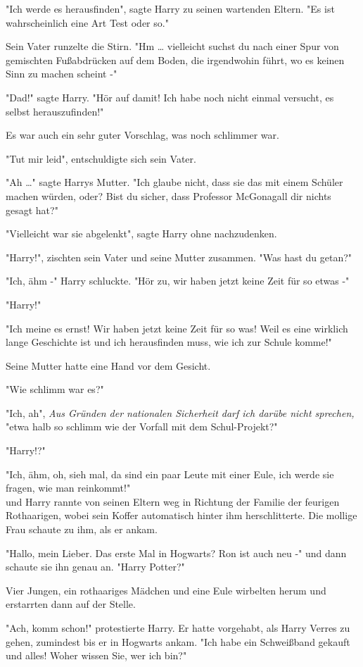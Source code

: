 {"Ich werde es herausfinden", sagte Harry zu seinen wartenden Eltern. "Es ist wahrscheinlich eine Art Test oder so."

Sein Vater runzelte die Stirn. "Hm … vielleicht suchst du nach einer Spur von gemischten Fußabdrücken auf dem Boden, die irgendwohin führt, wo es keinen Sinn zu machen scheint -"

"Dad!" sagte Harry. "Hör auf damit! Ich habe noch nicht einmal versucht, es selbst herauszufinden!"

Es war auch ein sehr guter Vorschlag, was noch schlimmer war.

"Tut mir leid", entschuldigte sich sein Vater.

"Ah …" sagte Harrys Mutter. "Ich glaube nicht, dass sie das mit einem Schüler machen würden, oder? Bist du sicher, dass Professor McGonagall dir nichts gesagt hat?"

"Vielleicht war sie abgelenkt", sagte Harry ohne nachzudenken.

"Harry!", zischten sein Vater und seine Mutter zusammen. "Was hast du getan?"

"Ich, ähm -" Harry schluckte. "Hör zu, wir haben jetzt keine Zeit für so etwas -"

"Harry!"

"Ich meine es ernst! Wir haben jetzt keine Zeit für so was! Weil es eine wirklich lange Geschichte ist und ich herausfinden muss, wie ich zur Schule komme!"

Seine Mutter hatte eine Hand vor dem Gesicht.

"Wie schlimm war es?"

"Ich, ah", \emph{Aus Gründen der nationalen Sicherheit darf ich darübe nicht sprechen,} "etwa halb so schlimm wie der Vorfall mit dem Schul-Projekt?"

"Harry!?"

"Ich, ähm, oh, sieh mal, da sind ein paar Leute mit einer Eule, ich werde sie fragen, wie man reinkommt!"\\ und Harry rannte von seinen Eltern weg in Richtung der Familie der feurigen Rothaarigen, wobei sein Koffer automatisch hinter ihm herschlitterte. Die mollige Frau schaute zu ihm, als er ankam.

"Hallo, mein Lieber. Das erste Mal in Hogwarts? Ron ist auch neu -" und dann schaute sie ihn genau an. "Harry Potter?"

Vier Jungen, ein rothaariges Mädchen und eine Eule wirbelten herum und erstarrten dann auf der Stelle.

"Ach, komm schon!" protestierte Harry. Er hatte vorgehabt, als Harry Verres zu gehen, zumindest bis er in Hogwarts ankam. "Ich habe ein Schweißband gekauft und alles! Woher wissen Sie, wer ich bin?"

}
